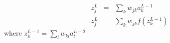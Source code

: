 \documentclass[11pt,onecolumn]{article}
\begin{document}
\begin{eqnarray}
    z^{L}_j &=& \sum_k w_{jk} a^{L-1}_k \\
    z^{L}_j &=& \sum_k w_{jk}f(z^{L-1}_k)
\end{eqnarray}    
where $z^{L-1}_k = \sum_l w_{kl} a^{L-2}_l$

\end{document}
